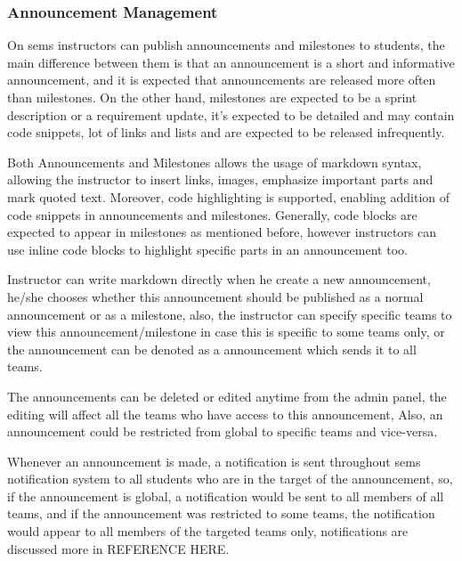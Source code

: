 \subsubsection{Announcement Management}
\label{subs:announcement-management}
On \ac{sems} instructors can publish announcements and milestones to students, the main difference between them
is that an announcement is a short and informative announcement, and it is expected that announcements are released
more often than milestones. On the other hand, milestones are expected to be a sprint description or a requirement update,
it's expected to be detailed and may contain code snippets, lot of links and lists and are expected to be released infrequently.

\newParagraph
Both Announcements and Milestones allows the usage of markdown syntax, allowing the instructor to insert links, images, emphasize important
parts and mark quoted text. Moreover, code highlighting is supported, enabling addition of code snippets in announcements and milestones. Generally,
code blocks are expected to appear in milestones as mentioned before, however instructors can use inline code blocks to highlight specific parts
in an announcement too.

\newParagraph
Instructor can write markdown directly when he create a new announcement, he/she chooses whether this announcement should be published
as a normal announcement or as a milestone, also, the instructor can specify specific teams to view this announcement/milestone in case
this is specific to some teams only, or the announcement can be denoted as a  announcement which sends it to all
teams.

\newParagraph
The announcements can be deleted or edited anytime from the admin panel, the editing will affect all the teams who have access to this announcement,
Also, an announcement could be restricted from global to specific teams and vice-versa.

\newParagraph
Whenever an announcement is made, a notification is sent throughout \ac{sems} notification system to all students who are in the target
of the announcement, so, if the announcement is global, a notification would be sent to all members of all teams, and if the announcement
was restricted to some teams, the notification would appear to all members of the targeted teams only, notifications are discussed more in
REFERENCE HERE.

